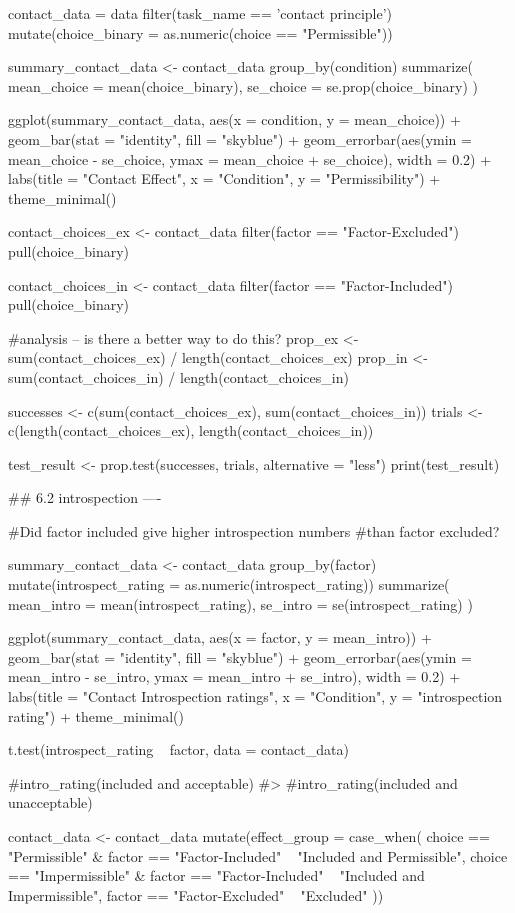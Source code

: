 \documentclass{article}
\begin{document}
contact_data = data %
  filter(task_name == 'contact principle') %
  mutate(choice_binary = as.numeric(choice == "Permissible"))

summary_contact_data <- contact_data %
  group_by(condition) %
  summarize(
    mean_choice = mean(choice_binary),
    se_choice = se.prop(choice_binary)
  )

ggplot(summary_contact_data, aes(x = condition, y = mean_choice)) +
  geom_bar(stat = "identity", fill = "skyblue") +
  geom_errorbar(aes(ymin = mean_choice - se_choice, ymax = mean_choice + se_choice), width = 0.2) +
  labs(title = "Contact Effect", x = "Condition", y = "Permissibility") +
  theme_minimal()

contact_choices_ex <- contact_data %
  filter(factor == "Factor-Excluded") %
  pull(choice_binary)

contact_choices_in <- contact_data %
  filter(factor == "Factor-Included") %
  pull(choice_binary)

#analysis -- is there a better way to do this?
prop_ex <- sum(contact_choices_ex) / length(contact_choices_ex)
prop_in <- sum(contact_choices_in) / length(contact_choices_in)

successes <- c(sum(contact_choices_ex), sum(contact_choices_in))
trials <- c(length(contact_choices_ex), length(contact_choices_in))

test_result <- prop.test(successes, trials, alternative = "less")
print(test_result)

    ## 6.2 introspection ----

#Did factor included give higher introspection numbers 
#than factor excluded?

summary_contact_data <- contact_data %
  group_by(factor) %
  mutate(introspect_rating = as.numeric(introspect_rating)) %
  summarize(
    mean_intro = mean(introspect_rating),
    se_intro = se(introspect_rating)
  )

ggplot(summary_contact_data, aes(x = factor, y = mean_intro)) +
  geom_bar(stat = "identity", fill = "skyblue") +
  geom_errorbar(aes(ymin = mean_intro - se_intro, ymax = mean_intro + se_intro), width = 0.2) +
  labs(title = "Contact Introspection ratings", x = "Condition", y = "introspection rating") +
  theme_minimal()

t.test(introspect_rating ~ factor, data = contact_data)

#intro_rating(included and acceptable)
#>
#intro_rating(included and unacceptable)

contact_data <- contact_data %
  mutate(effect_group = case_when(
    choice == "Permissible" & factor == "Factor-Included" ~ "Included and Permissible",
    choice == "Impermissible" & factor == "Factor-Included" ~ "Included and Impermissible",
    factor == "Factor-Excluded" ~ "Excluded"
  ))
\end{document}
